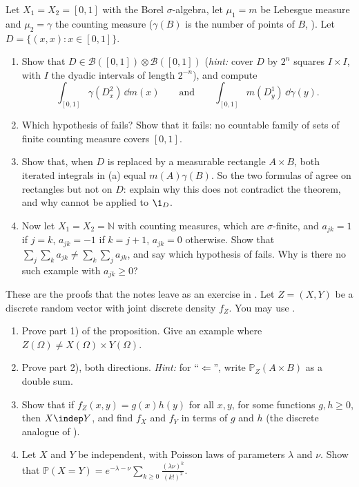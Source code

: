 \begin{exercise}\label{ex:pm-hypotheses}
\hard Let $X_1=X_2=[0,1]$ with the Borel $\sigma$-algebra, let $\mu_1=m$ be Lebesgue measure
and $\mu_2=\gamma$ the counting measure ($\gamma(B)$ is the number of points of $B$,
). Let $D=\{(x,x):x\in[0,1]\}$.
\begin{enumerate}[label=(\alph*)]
  \item Show that $D\in\mathcal B([0,1])\otimes\mathcal B([0,1])$ (\emph{hint:} cover $D$ by
    $2^n$ squares $I\times I$, with $I$ the dyadic intervals of length $2^{-n}$), and compute
    \[
      \int_{[0,1]}\gamma(D^2_x)\,\dd m(x)\qquad\text{and}\qquad\int_{[0,1]}m(D^1_y)\,\dd\gamma(y).
    \]
  \item Which hypothesis of  fails? Show that it fails: no countable
    family of sets of finite counting measure covers $[0,1]$.
  \item Show that, when $D$ is replaced by a measurable rectangle $A\times B$, both iterated
    integrals in (a) equal $m(A)\gamma(B)$. So the two formulas of
     agree on rectangles but not on $D$: explain why this does not
    contradict the theorem, and why  cannot be applied to $\1_D$.
  \item Now let $X_1=X_2=\mathbb N$ with counting measures, which are $\sigma$-finite, and
    $a_{jk}=1$ if $j=k$, $a_{jk}=-1$ if $k=j+1$, $a_{jk}=0$ otherwise. Show that
    $\sum_j\sum_ka_{jk}\ne\sum_k\sum_ja_{jk}$, and say which hypothesis of
     fails. Why is there no such example with $a_{jk}\ge0$?
\end{enumerate}
\end{exercise}

\begin{exercise}\label{ex:pm-discrete}
\easy These are the proofs that the notes leave as an exercise in
. Let $Z=(X,Y)$ be a discrete random vector with joint
discrete density $f_Z$. You may use .
\begin{enumerate}[label=(\alph*)]
  \item Prove part 1) of the proposition. Give an example where
    $Z(\Omega)\ne X(\Omega)\times Y(\Omega)$.
  \item Prove part 2), both directions. \emph{Hint:} for ``$\Leftarrow$'', write
    $\mathbb P_Z(A\times B)$ as a double sum.
  \item Show that if $f_Z(x,y)=g(x)h(y)$ for all $x,y$, for some functions $g,h\ge0$, then
    $X\indep Y$, and find $f_X$ and $f_Y$ in terms of $g$ and $h$ (the discrete analogue of
    ).
  \item Let $X$ and $Y$ be independent, with Poisson laws of parameters $\lambda$ and $\nu$.
    Show that $\mathbb P(X=Y)=e^{-\lambda-\nu}\sum_{k\ge0}\frac{(\lambda\nu)^k}{(k!)^2}$.
\end{enumerate}
\end{exercise}

